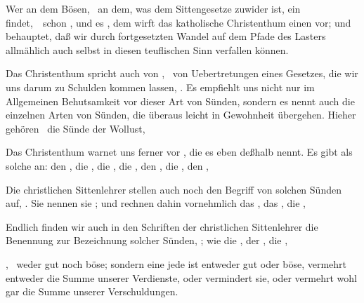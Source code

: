 \begin{aufza}
\begin{aufzb}
\item Wer an dem Bösen, \dh\  an dem, was dem Sittengesetze zuwider ist, ein  findet,~\ schon , und es , dem wirft das katholische Christenthum einen  vor; und behauptet, daß wir durch fortgesetzten Wandel auf dem Pfade des Lasters allmählich auch selbst in diesen teuflischen Sinn verfallen können.
\item Das Christenthum spricht auch von , \dh\  von Uebertretungen eines Gesetzes, die wir uns darum zu Schulden kommen lassen, . Es empfiehlt uns nicht nur im Allgemeinen Behutsamkeit vor dieser Art von Sünden, sondern es nennt auch die einzelnen Arten von Sünden, die überaus leicht in Gewohnheit übergehen. Hieher gehören \zB\  die Sünde der Wollust, \uam
\item Das Christenthum warnet uns ferner vor , die es eben deßhalb  nennt. Es gibt als solche an: den , die , die , die , den , die , den , \uam
\item Die christlichen Sittenlehrer stellen auch noch den Begriff von solchen Sünden auf, . Sie nennen sie ; und rechnen dahin vornehmlich das , das , die , \usw\
\item Endlich finden wir auch in den Schriften der christlichen Sittenlehrer die Benennung  zur Bezeichnung solcher Sünden, ; wie die , der , die , \udgl~
\end{aufzb}
\item {}, \dh\  weder gut noch böse; sondern eine jede ist entweder gut oder böse, vermehrt entweder die Summe unserer Verdienste, oder vermindert sie, oder vermehrt wohl gar die Summe unserer Verschuldungen.
\end{aufza}

